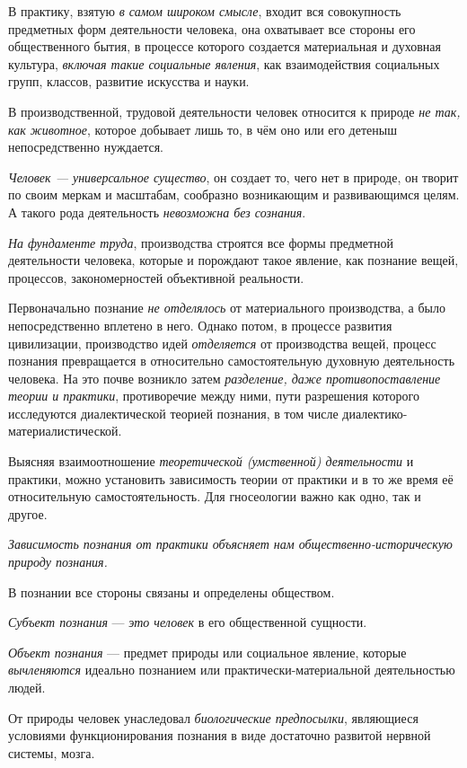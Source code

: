 \documentclass[a4paper,14pt,russian]{extreport}
\begin{document}
В практику, взятую \emph{в самом широком смысле}, входит вся совокупность предметных форм деятельности человека, она охватывает все стороны его общественного бытия, в процессе которого создается материальная и духовная культура, \emph{включая такие социальные явления}, как взаимодействия социальных групп, классов, развитие искусства и науки.

В производственной, трудовой деятельности человек относится к природе \emph{не так, как животное}, которое добывает лишь то, в чём оно или его детеныш непосредственно нуждается.

\emph{Человек --- универсальное существо}, он создает то, чего нет в природе, он творит по своим меркам и масштабам, сообразно возникающим и развивающимся целям. А такого рода деятельность \emph{невозможна без сознания}.

\emph{На фундаменте труда}, производства строятся все формы предметной деятельности человека, которые и порождают такое явление, как познание вещей, процессов, закономерностей объективной реальности.

Первоначально познание \emph{не отделялось} от материального производства, а было непосредственно вплетено в него. Однако потом, в процессе развития цивилизации, производство идей \emph{отделяется} от производства вещей, процесс познания превращается в относительно самостоятельную духовную деятельность человека. На это почве возникло затем \emph{разделение, даже противопоставление теории и практики}, противоречие между ними, пути разрешения которого исследуются диалектической теорией познания, в том числе диалектико-материалистической.

Выясняя взаимоотношение \emph{теоретической (умственной) деятельности} и практики, можно установить зависимость теории от практики и в то же время её относительную самостоятельность. Для гносеологии важно как одно, так и другое.

\emph{Зависимость познания от практики объясняет нам общественно-историческую природу познания.}

В познании все стороны связаны и определены обществом.

\emph{Субъект познания} --- \emph{это человек} в его общественной сущности.

\emph{Объект познания} --- предмет природы или социальное явление, которые \emph{вычленяются} идеально познанием или практически-материальной деятельностью людей.

От природы человек унаследовал \emph{биологические предпосылки}, являющиеся условиями функционирования познания в виде достаточно развитой нервной системы, мозга.
\end{document}
